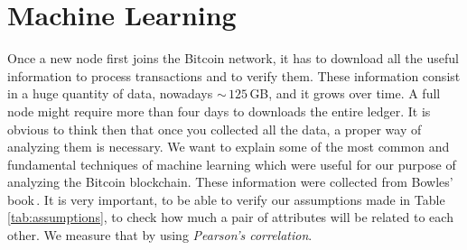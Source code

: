 \documentclass[USenglish]{uit-thesis}
\begin{document}
\section{Machine Learning}
\label{sec:machinelearning}
Once a new node first joins the Bitcoin network, it has to download
all the useful information to process transactions and to
verify them. These information consist in a huge quantity
of data, nowadays $\sim$\,$125$\,GB, and it grows over time.
A full node might require more than four days to 
downloads the entire ledger. It is obvious to think then that once you
collected all the data, a proper way of analyzing them is necessary.
We want to explain some of the most common and
fundamental techniques of machine learning which were
useful for our purpose of analyzing the Bitcoin blockchain.
These information were collected from Bowles' book\,\cite{bowles2015machine}.
It is very important, to be able to verify our assumptions made in
Table\,\ref{tab:assumptions}, to check how much
a pair of attributes will be related to each other.
We measure that by using \emph{Pearson's correlation}.
\end{document}

